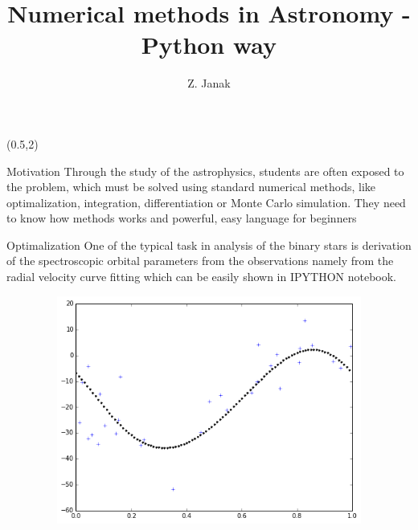 \documentclass[unknownkeysallowed]{beamer}
\title{Numerical methods in Astronomy - Python way}
\author{Z. Janak}
\date{}
\begin{document}
\begin{frame}{} 

\begin{textblock}{14.00}(0.5,2)
\begin{block}{Motivation}
Through the study of the astrophysics, students are often exposed to the problem,
which must be solved using standard numerical methods, like optimalization, integration,
differentiation or Monte Carlo simulation. They need to know how methods works and 
powerful, easy language for beginners
\end{block}
\begin{block}{Optimalization}
One of the typical task in analysis of the binary stars is derivation of the spectroscopic orbital 
parameters from the observations namely from the radial velocity curve fitting which can be easily
shown in IPYTHON notebook.
\begin{figure}
\includegraphics[width=1\textwidth, height=7.5cm]{radialvelocity.png}
\end{figure}
\end{block}
\end{textblock}


\end{frame}
\end{document}
